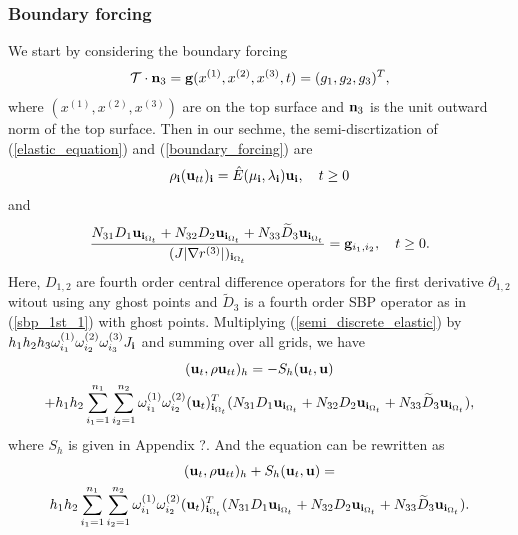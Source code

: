 \documentclass[a4paper]{article}
\newcommand{\wt}{\widetilde}
\begin{document}
\subsubsection{Boundary forcing}
We start by considering the boundary forcing
\begin{equation}\label{boundary_forcing}
\mathcal{T}\cdot{\bf n}_3 = {\bf g}(x^{(1)},x^{(2)},x^{(3)},t) = (g_1,g_2,g_3)^T,
\end{equation}
where $(x^{(1)},x^{(2)},x^{(3)})$ are on the top surface and ${\bf n}_3$ is the unit outward norm of the top surface. Then in our sechme, the semi-discrtization of (\ref{elastic_equation}) and (\ref{boundary_forcing}) are
\begin{equation}\label{semi_discrete_elastic}
\rho_{\bf i}({\bf u}_{tt})_{\bf i} = \hat{E}(\mu_{\bf i},\lambda_{\bf i}){\bf u}_{\bf i}, \ \ \ t\geq0 
\end{equation}
and
\begin{equation}\label{discrete_boundary_forcing}
\frac{N_{31} D_1 {\bf u}_{{\bf i}_{\Omega_t}} + N_{32} D_2 {\bf u}_{{\bf i}_{\Omega_t}} + N_{33} \wt{D}_3 {\bf u}_{{\bf i}_{\Omega_t}}}{(J|\nabla r^{(3)}|)_{{\bf i}_{\Omega_t}}}  = {\bf g}_{i_1,i_2}, \ \ \ t\geq0.
\end{equation}
Here, $D_{1,2}$ are fourth order central difference operators for the first derivative $\partial_{1,2}$ witout using any ghost points and $\wt{D}_3$ is a fourth order SBP operator as in (\ref{sbp_1st_1}) with ghost points. Multiplying (\ref{semi_discrete_elastic}) by $h_1h_2h_3\omega_{i_1}^{(1)}\omega_{i_2}^{(2)}\omega_{i_3}^{(3)}J_{\bf i}$ and summing over all grids, we have
\begin{multline*}
({\bf u}_t,\rho{\bf u}_{tt})_h = -S_h({\bf u}_t,{\bf u}) \\
+ h_1h_2\sum_{i_1=1}^{n_1}\sum_{i_2=1}^{n_2}\omega_{i_1}^{(1)}\omega_{i_2}^{(2)}({\bf u}_t)_{{\bf i}_{\Omega_t}}^T(N_{31}D_1{\bf u}_{{\bf i}_{\Omega_t}} + N_{32}D_2{\bf u}_{{\bf i}_{\Omega_t}} +N_{33}\wt{D}_3{\bf u}_{{\bf i}_{\Omega_t}}),
\end{multline*}
where $S_h$ is given in Appendix ?. And the equation can be rewritten as
\begin{multline}\label{time_derivative_energy}
({\bf u}_t,\rho{\bf u}_{tt})_h + S_h({\bf u}_t,{\bf u}) = \\
h_1h_2\sum_{i_1=1}^{n_1}\sum_{i_2=1}^{n_2}\omega_{i_1}^{(1)}\omega_{i_2}^{(2)}({\bf u}_t)_{{\bf i}_{\Omega_t}}^T(N_{31}D_1{\bf u}_{{\bf i}_{\Omega_t}} + N_{32}D_2{\bf u}_{{\bf i}_{\Omega_t}} +N_{33}\wt{D}_3{\bf u}_{{\bf i}_{\Omega_t}}).
\end{multline}
\end{document}
